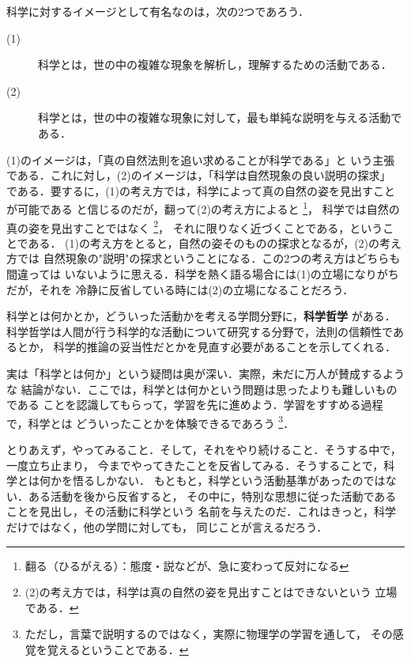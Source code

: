             科学に対するイメージとして有名なのは，次の2つであろう．
                \begin{description}
                    \item[ (1)] 科学とは，世の中の複雑な現象を解析し，理解するための活動である．
                    \item[ (2)] 科学とは，世の中の複雑な現象に対して，最も単純な説明を与える活動である．
                \end{description}
            (1)のイメージは，「真の自然法則を追い求めることが科学である」と
            いう主張である．これに対し，(2)のイメージは，「科学は自然現象の良い説明の探求」
            である．要するに，(1)の考え方では，科学によって真の自然の姿を見出すことが可能である
            と信じるのだが，翻って(2)の考え方によると
                \footnote{
                    翻る（ひるがえる）：態度・説などが、急に変わって反対になる
                }，
            科学では自然の真の姿を見出すことではなく
                \footnote{
                    (2)の考え方では，科学は真の自然の姿を見出すことはできないという
                    立場である．
                }，
            それに限りなく近づくことである，ということである．
            (1)の考え方をとると，自然の姿そのものの探求となるが，(2)の考え方では
            自然現象の"説明"の探求ということになる．この2つの考え方はどちらも間違っては
            いないように思える．科学を熱く語る場合には(1)の立場になりがちだが，それを
            冷静に反省している時には(2)の立場になることだろう．

            科学とは何かとか，どういった活動かを考える学問分野に，\textbf{科学哲学} がある．
            科学哲学は人間が行う科学的な活動について研究する分野で，法則の信頼性であるとか，
            科学的推論の妥当性だとかを見直す必要があることを示してくれる．

            実は「科学とは何か」という疑問は奥が深い．実際，未だに万人が賛成するような
            結論がない．ここでは，科学とは何かという問題は思ったよりも難しいものである
            ことを認識してもらって，学習を先に進めよう．学習をすすめる過程で，科学とは
            どういったことかを体験できるであろう
                \footnote{
                    ただし，言葉で説明するのではなく，実際に物理学の学習を通して，
                    その感覚を覚えるということである．
                }．

             とりあえず，やってみること．そして，それをやり続けること．そうする中で，一度立ち止まり，
             今までやってきたことを反省してみる．そうすることで，科学とは何かを悟るしかない．
             もともと，科学という活動基準があったのではない．ある活動を後から反省すると，
             その中に，特別な思想に従った活動であることを見出し，その活動に科学という
             名前を与えたのだ．これはきっと，科学だけではなく，他の学問に対しても，
             同じことが言えるだろう．

